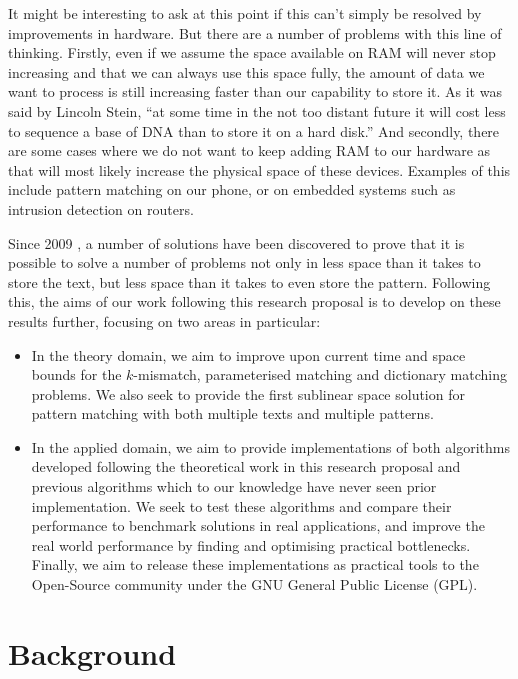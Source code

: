 \documentclass[a4paper,11pt]{article}
\begin{document}
    It might be interesting to ask at this point if this can't simply be resolved by improvements in hardware. But there are a number of problems with this line of thinking. Firstly, even if we assume the space available on RAM will never stop increasing and that we can always use this space fully, the amount of data we want to process is still increasing faster than our capability to store it. As it was said by Lincoln Stein, ``at some time in the not too distant future it will cost less to sequence a base of DNA than to store it on a hard disk.'' \cite{20441614} And secondly, there are some cases where we do not want to keep adding RAM to our hardware as that will most likely increase the physical space of these devices. Examples of this include pattern matching on our phone, or on embedded systems such as intrusion detection on routers.

    Since 2009 \cite{5438620}, a number of solutions have been discovered to prove that it is possible to solve a number of problems not only in less space than it takes to store the text, but less space than it takes to even store the pattern. Following this, the aims of our work following this research proposal is to develop on these results further, focusing on two areas in particular:

    \begin{itemize}
        \item In the theory domain, we aim to improve upon current time and space bounds for the $k$-mismatch, parameterised matching and dictionary matching problems. We also seek to provide the first sublinear space solution for pattern matching with both multiple texts and multiple patterns.
        \item In the applied domain, we aim to provide implementations of both algorithms developed following the theoretical work in this research proposal and previous algorithms which to our knowledge have never seen prior implementation. We seek to test these algorithms and compare their performance to benchmark solutions in real applications, and improve the real world performance by finding and optimising practical bottlenecks. Finally, we aim to release these implementations as practical tools to the Open-Source community under the GNU General Public License (GPL).
    \end{itemize}

    \section{Background}
\end{document}
